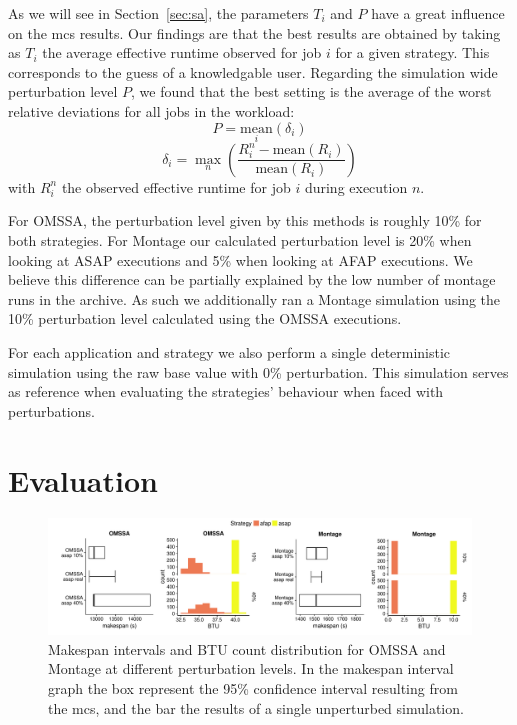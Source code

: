 \documentclass[10pt,conference,compsocconf]{IEEEtran}
\begin{document}
As we  will see  in Section~\ref{sec:sa},  the parameters $T_i$  and $P$  have a
great influence on the \ac{mcs} results.  Our findings are that the best results
are obtained by  taking as $T_i$ the average effective  runtime observed for job
$i$ for a given  strategy. This corresponds to the guess of a knowledgable user.
Regarding  the simulation  wide perturbation level  $P$, we found  that the best
setting  is the average  of the worst relative deviations for all jobs in the
workload:
\begin{equation}
P = \underset{i}{\textrm{mean}}(\delta{}_i)
\end{equation}
\begin{equation}
\delta{}_i =
\max_n\left(\frac{R_i^n-\textrm{mean}(R_i)}{\textrm{mean}(R_i)}\right)
\end{equation}
with $R_i^n$ the observed effective runtime for job $i$ during execution $n$. 

For OMSSA, the perturbation level given by this methods is roughly 10\% for both
strategies. For Montage  our calculated perturbation level is  20\% when looking
at ASAP  executions and  5\% when  looking at AFAP  executions. We  believe this
difference can be partially  explained by the low number of  montage runs in the
archive. As such we additionally ran a Montage simulation using the 10\% 
perturbation level calculated using the OMSSA executions.

For  each  application and  strategy  we  also  perform a  single  deterministic
simulation  using the  raw base  value  with 0\%  perturbation. This  simulation
serves as  reference when  evaluating the strategies' behaviour when  faced with
perturbations.

\section{Evaluation}
\label{sec:eval}

\begin{figure}
	\includegraphics[width=\textwidth]{gfx/int_plot.pdf}
	\caption{Makespan intervals and BTU count distribution for OMSSA and 
	Montage at different perturbation levels. In the makespan interval graph 
	the box represent the 95\% confidence interval resulting from the \acs{mcs},
	and the bar the results of a single unperturbed simulation.}\label{fig:int}
\end{figure}
\end{document}
